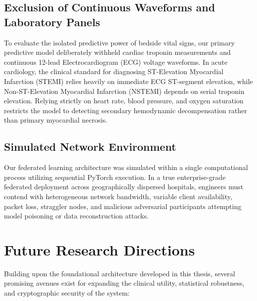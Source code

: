 \documentclass[12pt,a4paper,oneside]{report}
\begin{document}
\subsection{Exclusion of Continuous Waveforms and Laboratory Panels}
To evaluate the isolated predictive power of bedside vital signs, our primary predictive model deliberately withheld cardiac troponin measurements and continuous 12-lead Electrocardiogram (ECG) voltage waveforms. In acute cardiology, the clinical standard for diagnosing ST-Elevation Myocardial Infarction (STEMI) relies heavily on immediate ECG ST-segment elevation, while Non-ST-Elevation Myocardial Infarction (NSTEMI) depends on serial troponin elevation. Relying strictly on heart rate, blood pressure, and oxygen saturation restricts the model to detecting secondary hemodynamic decompensation rather than primary myocardial necrosis.

\subsection{Simulated Network Environment}
Our federated learning architecture was simulated within a single computational process utilizing sequential PyTorch execution. In a true enterprise-grade federated deployment across geographically dispersed hospitals, engineers must contend with heterogeneous network bandwidth, variable client availability, packet loss, straggler nodes, and malicious adversarial participants attempting model poisoning or data reconstruction attacks.

\section{Future Research Directions}
\label{sec:future_directions}

Building upon the foundational architecture developed in this thesis, several promising avenues exist for expanding the clinical utility, statistical robustness, and cryptographic security of the system:
\end{document}
